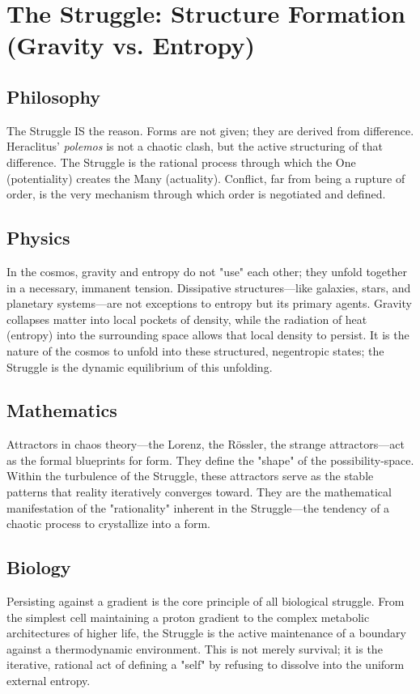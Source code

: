 \section{The Struggle: Structure Formation (Gravity vs. Entropy)}

\subsection{Philosophy}
The Struggle IS the reason. Forms are not given; they are derived from difference. Heraclitus’ \textit{polemos} is not a chaotic clash, but the active structuring of that difference. The Struggle is the rational process through which the One (potentiality) creates the Many (actuality). Conflict, far from being a rupture of order, is the very mechanism through which order is negotiated and defined.

\subsection{Physics}
In the cosmos, gravity and entropy do not "use" each other; they unfold together in a necessary, immanent tension. Dissipative structures—like galaxies, stars, and planetary systems—are not exceptions to entropy but its primary agents. Gravity collapses matter into local pockets of density, while the radiation of heat (entropy) into the surrounding space allows that local density to persist. It is the nature of the cosmos to unfold into these structured, negentropic states; the Struggle is the dynamic equilibrium of this unfolding.

\subsection{Mathematics}
Attractors in chaos theory—the Lorenz, the Rössler, the strange attractors—act as the formal blueprints for form. They define the "shape" of the possibility-space. Within the turbulence of the Struggle, these attractors serve as the stable patterns that reality iteratively converges toward. They are the mathematical manifestation of the "rationality" inherent in the Struggle—the tendency of a chaotic process to crystallize into a form.

\subsection{Biology}
Persisting against a gradient is the core principle of all biological struggle. From the simplest cell maintaining a proton gradient to the complex metabolic architectures of higher life, the Struggle is the active maintenance of a boundary against a thermodynamic environment. This is not merely survival; it is the iterative, rational act of defining a "self" by refusing to dissolve into the uniform external entropy.

